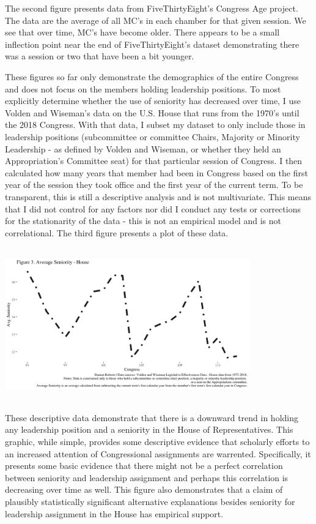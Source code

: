 \documentclass [12pt]{article}
\begin{document}
The second figure presents data from FiveThirtyEight's Congress Age project. The data are the average of all MC's in each chamber for that given session. We see that over time, MC's have become older. There appears to be a small inflection point near the end of FiveThirtyEight's dataset demonstrating there was a session or two that have been a bit younger.

These figures so far only demonstrate the demographics of the entire Congress and does not focus on the members holding leadership positions. To most explicitly determine whether the use of seniority has decreased over time, I use Volden and Wiseman's data on the U.S. House that runs from the 1970's until the 2018 Congress. With that data, I subset my dataset to only include those in leadership positions (subcommittee or committee Chairs, Majority or Minority Leadership - as defined by Volden and Wiseman, or whether they held an Appropriation's Committee seat) for that particular session of Congress. I then calculated how many years that member had been in Congress based on the first year of the session they took office and the first year of the current term. To be transparent, this is still a descriptive analysis and is not multivariate. This means that I did not control for any factors nor did I conduct any tests or corrections for the stationarity of the data - this is not an empirical model and is not correlational. The third figure presents a plot of these data.

\includegraphics[height=250,width=400]{../figures/avg-house-seniority-macro.png}

These descriptive data demonstrate that there is a downward trend in holding any leadership position and a seniority in the House of Representatives. This graphic, while simple, provides some descriptive evidence that scholarly efforts to an increased attention of Congressional assignments are warrented. Specifically, it presents some basic evidence that there might not be a perfect correlation between seniority and leadership assignment and perhaps this correlation is decreasing over time as well. This figure also demonstrates that a claim of plausibly statistically significant alternative explanations besides seniority for leadership assignment in the House has empirical support. 
\end{document}
